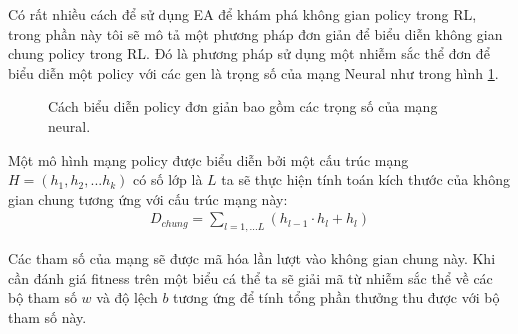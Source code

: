 Có rất nhiều cách để sử dụng EA để khám phá không gian policy trong RL\cite{moriarty1999earl}, trong phần này tôi sẽ mô tả một phương pháp đơn giản để biểu diễn không gian chung policy trong RL. Đó là phương pháp sử dụng một nhiễm sắc thể đơn để biểu diễn một policy với các gen là trọng số của mạng Neural như trong hình \ref{fig:problem:policy}. 
\begin{figure}[ht]
    \centering
    \caption{Cách biểu diễn policy đơn giản bao gồm các trọng số của mạng neural.}
    \label{fig:problem:policy}
\end{figure}
Một mô hình mạng policy được biểu diễn bởi một cấu trúc mạng $H=(h_1,h_2,...h_k)$ có số lớp là $L$ ta sẽ thực hiện tính toán kích thước của không gian chung tương ứng với cấu trúc mạng này:
\begin{align}
    D_{chung} = \sum_{l={1,...L}}(h_{l-1}\cdot h_l + h_l)
\end{align}

Các tham số của mạng sẽ được mã hóa lần lượt vào không gian chung này. Khi cần đánh giá fitness trên một biểu cá thể ta sẽ giải mã từ nhiễm sắc thể về các bộ tham số $w$ và độ lệch $b$ tương ứng để tính tổng phần thưởng thu được với bộ tham số này.



